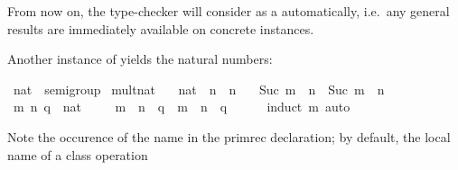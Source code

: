 \begin{isabellebody}
\begin{isamarkuptext}
  From now on, the type-checker will consider  as a  automatically, i.e.\ any general results are immediately
  available on concrete instances.

  \medskip Another instance of  yields the natural
  numbers:%
\end{isamarkuptext}%
\isamarkuptrue%
%
\isadelimquote
%
\endisadelimquote
%
\isatagquote
{}\isamarkupfalse%
\ nat\ {}{}\ semigroup\isanewline
{}\isanewline
\isanewline
{}\isamarkupfalse%
\ mult{}nat\ \isanewline
\ \ {}{}{}{}nat{}\ {}\ n\ {}\ n{}\isanewline
\ \ {}\ {}Suc\ m\ {}\ n\ {}\ Suc\ {}m\ {}\ n{}{}\isanewline
\isanewline
{}\isamarkupfalse%
\ \isamarkupfalse%
\isanewline
\ \ \isamarkupfalse%
\ m\ n\ q\ {}{}\ nat\ \isanewline
\ \ \isamarkupfalse%
\ {}m\ {}\ n\ {}\ q\ {}\ m\ {}\ {}n\ {}\ q{}{}\isanewline
\ \ \ \ \isamarkupfalse%
\ {}induct\ m{}\ auto\isanewline
{}\isamarkupfalse%
\isanewline
\isanewline
{}\isamarkupfalse%
%
\endisatagquote
{\isafoldquote}%
%
\isadelimquote
%
\endisadelimquote
%
\begin{isamarkuptext}%
\noindent Note the occurence of the name  in the
  primrec declaration; by default, the local name of a class operation

\end{isamarkuptext}
\end{isabellebody}
